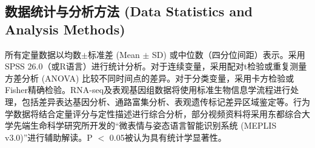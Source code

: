 \subsection{数据统计与分析方法 (Data Statistics and Analysis Methods)}

所有定量数据以均数$\pm$标准差 (Mean $\pm$ SD) 或中位数（四分位间距）表示。采用SPSS 26.0（或R语言）进行统计分析。对于连续变量，采用配对t检验或重复测量方差分析 (ANOVA) 比较不同时间点的差异。对于分类变量，采用卡方检验或Fisher精确检验。RNA-seq及表观基因组数据将使用标准生物信息学流程进行处理，包括差异表达基因分析、通路富集分析、表观遗传标记差异区域鉴定等。行为学数据将结合定量评分与定性描述进行综合分析，部分视频资料将采用东都综合大学先端生命科学研究所开发的“微表情与姿态语言智能识别系统 (MEPLIS v3.0)”进行辅助解读。P $<$ 0.05被认为具有统计学显著性。
